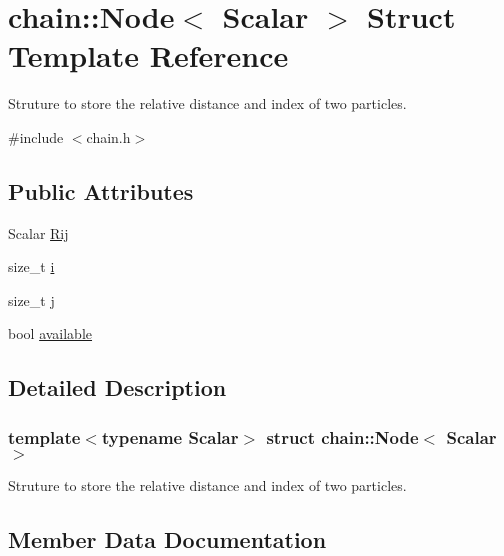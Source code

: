 \hypertarget{structchain_1_1_node}{}\section{chain\+:\+:Node$<$ Scalar $>$ Struct Template Reference}
\label{structchain_1_1_node}


Struture to store the relative distance and index of two particles.  




{\ttfamily \#include $<$chain.\+h$>$}

\subsection*{Public Attributes}
\begin{DoxyCompactItemize}
\item 
Scalar \mbox{\hyperlink{structchain_1_1_node_a3a9ca49370eba9c8ce1d6b2a146c93ee}{Rij}}
\item 
size\+\_\+t \mbox{\hyperlink{structchain_1_1_node_a289ef3bad054158a446e53481c2a9d17}{i}}
\item 
size\+\_\+t \mbox{\hyperlink{structchain_1_1_node_aa41c0c59d6cdd4263a72b9e5284aa3d9}{j}}
\item 
bool \mbox{\hyperlink{structchain_1_1_node_ac06192f15a8dba90e35c508b17aa0e63}{available}}
\end{DoxyCompactItemize}


\subsection{Detailed Description}
\subsubsection*{template$<$typename Scalar$>$\newline
struct chain\+::\+Node$<$ Scalar $>$}

Struture to store the relative distance and index of two particles. 

\subsection{Member Data Documentation}
\mbox{\label{structchain_1_1_node_ac06192f15a8dba90e35c508b17aa0e63}} 
